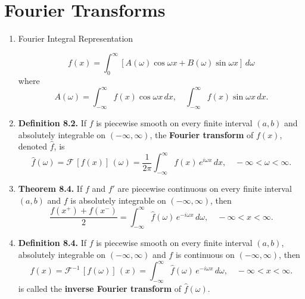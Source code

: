 \newpage

\section{Fourier Transforms}

\begin{enumerate}


\item Fourier Integral Representation

\[f(x) = \int _{0}^{\infty} \left[A(\omega)\cos \omega x + B(\omega) \sin \omega x \right]\, d\omega\]
where 
\[A(\omega) = \int _{-\infty}^{\infty} f(x)\cos \omega x \, dx ,\quad \int_{-\infty}^{\infty} f(x) \sin \omega x \,dx.\]

\item \textbf{Definition 8.2.} If $f$ is piecewise smooth on every finite interval $(a, b)$ and absolutely integrable on $(-\infty, \infty)$, the \textbf{Fourier transform} of $f(x)$, denoted $\widehat{f}$, is
\[\widehat{f}(\omega) = \mathcal{F} \, [f(x)] \,(\omega) =  \frac{1}{2\pi} \int_{-\infty} ^{\infty}f(x) \,e^{i\omega x} \,dx, \quad -\infty < \omega <\infty.\]


\item \textbf{Theorem 8.4.} If $f$ and $f'$ are piecewise continuous on every finite interval $(a, b)$ and $f$ is absolutely integrable on $(-\infty, \infty)$, then
\[\frac{f(x^{+})+f(x^{-})}{2} = \int_{-\infty}^{\infty}\widehat{f}(\omega)\, e^{-i\omega x}\, d\omega, \quad -\infty <x<\infty.\]

\item \textbf{Definition 8.4.} If $f$ is piecewise smooth on every finite interval $(a, b)$, absolutely integrable on $(-\infty, \infty)$ and $f$ is continuous on $(-\infty, \infty)$, then 
\[{f}(x) = \mathcal{F}^{-1} \, [f(\omega)] \,(x) =  \int_{-\infty} ^{\infty}\widehat{f}(\omega) \,e^{-i\omega x} \,d\omega, \quad -\infty < x <\infty.\]
is called the \textbf{inverse Fourier transform} of $\widehat{f} (\omega)$.


\end{enumerate}
